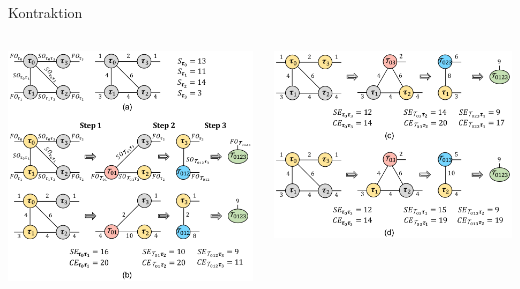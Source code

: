 \documentclass{beamer}
\begin{document}
\begin{frame}{Kontraktion}
	\begin{columns}
		\begin{column}{0.5\textwidth}
			\includegraphics[scale=.17]{figure-3-a}
		\end{column}
		\begin{column}{0.5\textwidth}
			\includegraphics[scale=.17]{figure-3-b}
		\end{column}
	\end{columns}
\end{frame}
\end{document}
